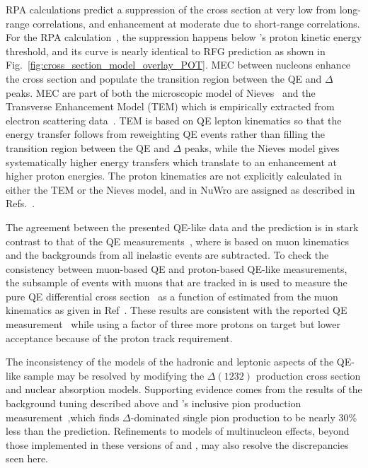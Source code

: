 RPA calculations predict a suppression of the cross section at very low \QSq 
from long-range correlations, and enhancement at moderate \QSq 
due to short-range correlations. For the \nuwro RPA 
calculation~\cite{Graczyk:2003ru}, the suppression happens below \minerva's proton 
kinetic energy threshold, and its curve is nearly identical to \nuwro RFG 
prediction as shown in Fig.~\ref{fig:cross_section_model_overlay_POT}.
MEC between nucleons enhance the cross section and populate the transition 
region between the QE and $\Delta$ peaks. MEC are part of 
both the microscopic model of Nieves~\cite{Nieves:2004wx,Gran:2013kda} and 
the Transverse Enhancement Model (TEM) which is empirically extracted from 
electron scattering data~\cite{Bodek:2011ps}. TEM is based on QE 
lepton kinematics so that the energy transfer follows from reweighting QE events 
rather than filling the transition region between the QE and $\Delta$ peaks, while the Nieves 
model gives systematically higher energy transfers which translate to an enhancement 
at higher proton energies. The proton kinematics are not explicitly calculated  
in either the TEM or the Nieves model, and in NuWro are assigned as described in 
Refs.~\cite{Sobczyk:2012ms,Golan:2013jtj}.

The agreement between the presented QE-like data and the \genie prediction
is in stark contrast to that of the \minerva QE 
measurements~\cite{Fields:2013zhk,Fiorentini:2013ezn}, where \QSq is based on 
muon kinematics and the backgrounds from all inelastic events 
are subtracted. To check the consistency between 
\minerva muon-based QE and proton-based QE-like measurements, the subsample of 
events with muons that are tracked in \minos is used to measure the pure QE 
differential cross section~\cite{supplemental} as a function of \QSq estimated 
from the muon kinematics as given in Ref~\cite{Fiorentini:2013ezn}. 
These results are consistent with the reported QE measurement~\cite{Fiorentini:2013ezn} 
while using a factor of three more protons on target but lower acceptance because 
of the proton track requirement.

The inconsistency of the models of the hadronic and leptonic aspects of the
QE-like sample may be resolved by modifying the $\Delta(1232)$ production cross section and 
nuclear absorption models. Supporting evidence comes from the results of 
the background tuning described above and \minerva's inclusive pion production
measurement~\cite{Eberly:2014mra},which finds $\Delta$-dominated single pion production 
to be nearly 30\% less than the \genie prediction. Refinements to models of multinucleon 
effects, beyond those implemented in these versions of \genie and \nuwro, may 
also resolve the discrepancies seen here.  

